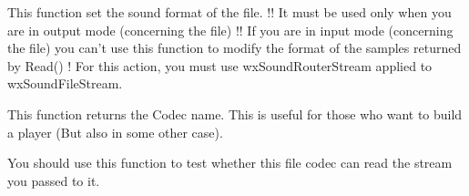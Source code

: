This function set the sound format of the file. !! It must be used only
when you are in output mode (concerning the file) !! If you are in
input mode (concerning the file) you can't use this function to modify
the format of the samples returned by Read() !
For this action, you must use wxSoundRouterStream applied to wxSoundFileStream. 


\label{wxsoundfilestreamgetcodecname}


This function returns the Codec name. This is useful for those who want to build
a player (But also in some other case).


\label{wxsoundfilestreamcanread}


You should use this function to test whether this file codec can read
the stream you passed to it.


\label{wxsoundfilestreampreparetoplay}



\label{wxsoundfilestreampreparetorecord}



\label{wxsoundfilestreamfinishrecording}



\label{wxsoundfilestreamrepositionstream}



\label{wxsoundfilestreamfinishpreparation}



\label{wxsoundfilestreamgetdata}



\label{wxsoundfilestreamputdata}



\label{wxsoundfilestreamonsoundevent}


